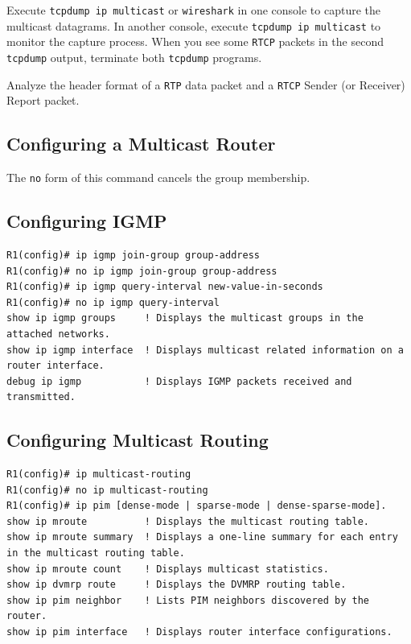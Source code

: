 \documentclass{../UTNetLab}
\begin{document}
    Execute \lstinline{tcpdump ip multicast} or \lstinline{wireshark} in one console to capture the multicast datagrams.
    In another console, execute \lstinline{tcpdump ip multicast} to monitor the capture process.
    When you see some \texttt{RTCP} packets in the second \lstinline{tcpdump} output, terminate both \lstinline{tcpdump} programs. 

    \begin{report}
    \item Analyze the header format of a \texttt{RTP} data packet and a \texttt{RTCP} Sender (or Receiver) Report packet.
    \end{report}

\clearpage
\begin{appendices}

\section{Configuring a Multicast Router}
    The \lstinline[language={cisco}]{no} form of this command cancels the group membership.
    \begin{subappendices}
\subsection{Configuring IGMP}
    \begin{lstlisting}[language={cisco}, emph={group-address, new-value-in-seconds}]
R1(config)# ip igmp join-group group-address
R1(config)# no ip igmp join-group group-address
R1(config)# ip igmp query-interval new-value-in-seconds
R1(config)# no ip igmp query-interval
show ip igmp groups     ! Displays the multicast groups in the attached networks.
show ip igmp interface  ! Displays multicast related information on a router interface.
debug ip igmp           ! Displays IGMP packets received and transmitted.
    \end{lstlisting}

\subsection{Configuring Multicast Routing}
    \begin{lstlisting}[language={cisco}]
R1(config)# ip multicast-routing
R1(config)# no ip multicast-routing
R1(config)# ip pim [dense-mode | sparse-mode | dense-sparse-mode].
show ip mroute          ! Displays the multicast routing table.
show ip mroute summary  ! Displays a one-line summary for each entry in the multicast routing table.
show ip mroute count    ! Displays multicast statistics.
show ip dvmrp route     ! Displays the DVMRP routing table.
show ip pim neighbor    ! Lists PIM neighbors discovered by the router.
show ip pim interface   ! Displays router interface configurations.
    \end{lstlisting}


\end{subappendices}
\end{appendices}
\end{document}
